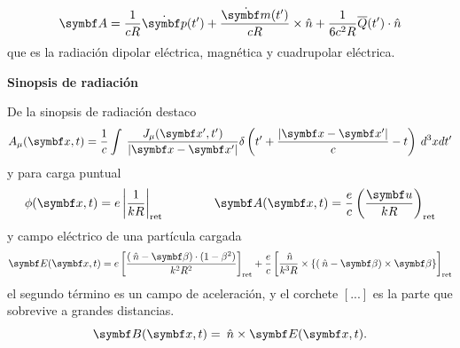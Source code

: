 \documentclass[10pt,oneside]{CBFT_book}
\begin{document}
\[
	\vb{A} = \frac{1}{cR} \dot{\vb{p}}(t') + \frac{\dot{\vb{m}}(t')}{cR} \times \hat{n} + 
	\frac{1}{6c^2R} {\overline{Q}}(t') \cdot \hat{n}
\]
que es la radiación dipolar eléctrica,  magnética y cuadrupolar eléctrica.

\begin{ejemplo}{\bf Sinopsis de radiación}

De la sinopsis de radiación destaco
\[
	A_\mu(\vbx,t) = \frac{1}{c} \int \: \frac{J_\mu(\vbx',t')}{|\vbx-\vbx'|} 
	\delta\left( t' + \frac{|\vbx-\vbx'|}{c} - t \right) \: d^3x dt'
\]
y para carga puntual
\[
	\phi(\vbx,t) = e \left| \frac{1}{kR} \right|_\text{ret} \qquad \qquad 
	\vb{A}(\vbx,t) = \frac{e}{c} \Frac{\vb{u}}{kR}_\text{ret}
\]
y campo eléctrico de una partícula cargada
\[
	\vb{E}(\vbx,t) = e \left[ \frac{ (\nver -\vb{\b} ) \cdot ( 1 - \beta^2 ) }{ k^2 R^2 } \right]_\text{ret} +
	\frac{ e }{ c } \left[ \frac{ \nver }{ k^3 R } \times \{ ( \nver - \vb{\b} ) \times \vb{\b} \} \right]_\text{ret}
\]
el segundo término es un campo de aceleración, y el corchete $[...]$ es la parte que sobrevive
a grandes distancias.
\[
	\vb{B}(\vbx,t) = \nver \times \vb{E}(\vbx,t).
\]
 
\end{ejemplo}
\end{document}
